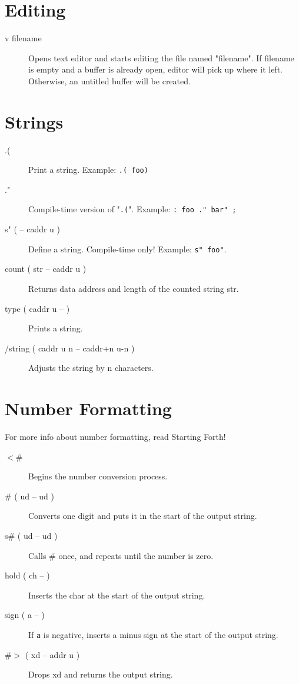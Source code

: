 \section{Editing}

\begin{description}
\item[v filename]

Opens text editor and starts editing the file named "filename".
If filename is empty and a buffer is already open, editor will pick up where it left.
Otherwise, an untitled buffer will be created.

\end{description}

\section{Strings}

\begin{description}
\item[.(]

Print a string. Example: \texttt{.( foo)}

\item[."]

Compile-time version of "\texttt{.(}". Example: \texttt{: foo ." bar" ;}

\item[s" ( -- caddr u )] Define a string. Compile-time only! Example: \texttt{s" foo"}.

\item[count ( str -- caddr u )] Returns data address and length of the counted string str.

\item[type ( caddr u -- )] Prints a string.

\item[/string ( caddr u n -- caddr+n u-n )] Adjusts the string by n characters.

\end{description}

\section{Number Formatting}

For more info about number formatting, read Starting Forth!

\begin{description}

\item[$<$\#] Begins the number conversion process.
\item[\# ( ud -- ud )] Converts one digit and puts it in the start of the output string.
\item[s\# ( ud -- ud )] Calls \# once, and repeats until the number is zero.
\item[hold ( ch -- )] Inserts the char at the start of the output string.
\item[sign ( a -- )] If \texttt{a} is negative, inserts a minus sign at the start of the output string.
\item[\#$>$ ( xd -- addr u )] Drops xd and returns the output string.

\end{description}

